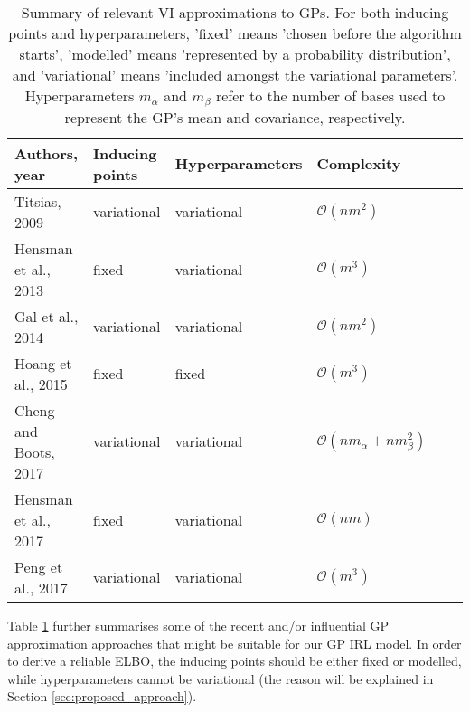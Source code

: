 \documentclass{mprop}
\theoremstyle{definition}
\begin{document}
\begin{table}
  \centering %
  \begin{tabular}{llllll} %
    \toprule
    Authors, year & Inducing points & Hyperparameters & Complexity \\
    \midrule
    Titsias, 2009 \cite{DBLP:journals/jmlr/Titsias09} & variational & variational & $\mathcal{O}(nm^2)$ \\
    Hensman et al., 2013 \cite{DBLP:conf/uai/HensmanFL13} & fixed & variational & $\mathcal{O}(m^3)$ \\
    Gal et al., 2014 \cite{DBLP:conf/nips/GalWR14} & variational & variational & $\mathcal{O}(nm^2)$ \\
    Hoang et al., 2015 \cite{DBLP:conf/icml/HoangHL15} & fixed & fixed & $\mathcal{O}(m^3)$ \\
    Cheng and Boots, 2017 \cite{DBLP:conf/nips/ChengB17} & variational & variational & $\mathcal{O}(nm_\alpha + nm_\beta^2)$ \\
    Hensman et al., 2017 \cite{DBLP:journals/jmlr/HensmanDS17} & fixed & variational & $\mathcal{O}(nm)$ \\
    Peng et al., 2017 \cite{DBLP:conf/icml/PengZZQ17} & variational & variational & $\mathcal{O}(m^3)$ \\
    \bottomrule
  \end{tabular}
  \caption{Summary of relevant VI approximations to GPs. For both inducing
    points and hyperparameters, 'fixed' means 'chosen before the algorithm
    starts', 'modelled' means 'represented by a probability distribution', and
    'variational' means 'included amongst the variational parameters'.
    Hyperparameters $m_\alpha$ and $m_\beta$ refer to the number of bases used
    to represent the GP's mean and covariance, respectively.}
  \label{table:approximations}
\end{table}

Table \ref{table:approximations} further summarises some of the recent and/or
influential GP approximation approaches that might be suitable for our GP IRL
model. In order to derive a reliable ELBO, the inducing points should be either
fixed or modelled, while hyperparameters cannot be variational (the reason will
be explained in Section \ref{sec:proposed_approach}).
\end{document}
